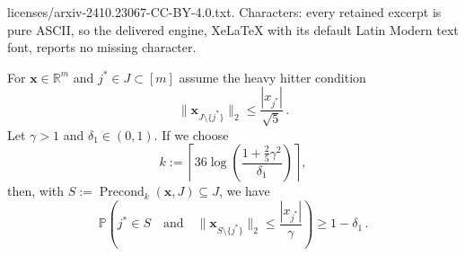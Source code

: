 \documentclass[10pt,a4paper]{amsart}
\renewcommand{\P}{{\mathbb P}}
\newcommand{\R}{{\mathbb R}}
\DeclareMathOperator{\precond}{Precond}
\renewcommand{\vec}{\boldsymbol}
\begin{document}
licenses/arxiv-2410.23067-CC-BY-4.0.txt. Characters: every retained excerpt is pure ASCII, so the delivered engine, XeLaTeX with its default Latin Modern text font, reports no missing character.
\begin{lemma} \label{lem:precond}
    For $\vec{x} \in \R^m$ and $j^\ast \in J \subset [m]$ assume the heavy hitter condition
    \begin{equation*} \label{eq:weakHHC}
        \|\vec{x}_{J \setminus\{j^\ast\}}\|_2
            \leq \frac{|x_{j^\ast}|}{\sqrt{5}} \,.
    \end{equation*}
    Let $\gamma > 1$ and $\delta_1 \in (0,1)$.
    If we choose
    \begin{equation*}
        k := \left\lceil 36 \log\left(\frac{1+\frac{2}{5}\gamma^2}{\delta_1}\right)\right\rceil ,
    \end{equation*}
    then, with $S := \precond_{k}(\vec{x},J) \subseteq J$, we have
    \begin{equation*}
        \P\left( j^\ast \in S \quad \text{and} \quad
            \|\vec{x}_{S \setminus\{j^\ast\}}\|_2 \leq \frac{|x_{j^\ast}|}{\gamma}
            \right)
            \geq 1-\delta_1 \,.
    \end{equation*}
\end{lemma}
\end{document}
